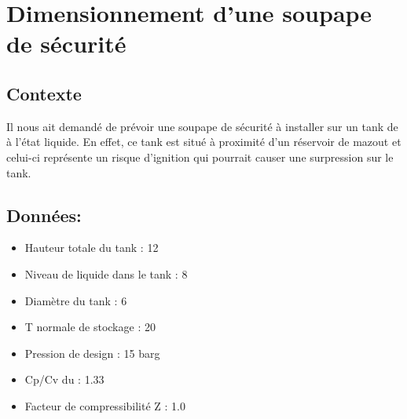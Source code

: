 
\chapter{Dimensionnement d'une soupape de sécurité}

\section{Contexte}
Il nous ait demandé de prévoir une soupape de sécurité à installer sur un tank de  à l'état liquide. En effet, ce tank est situé à proximité d'un réservoir de mazout et celui-ci représente un risque d'ignition qui pourrait causer une surpression sur le tank. 

\section{\large{Données:}}
\begin{itemize}
\item Hauteur totale du tank : 12\meter
\item Niveau de  liquide dans le tank : 8\meter
\item Diamètre du tank : 6\meter
\item T normale de stockage : 20\celsius
\item Pression de design : 15 barg
\item Cp/Cv du  : 1.33
\item Facteur de compressibilité Z : 1.0
\end{itemize}

